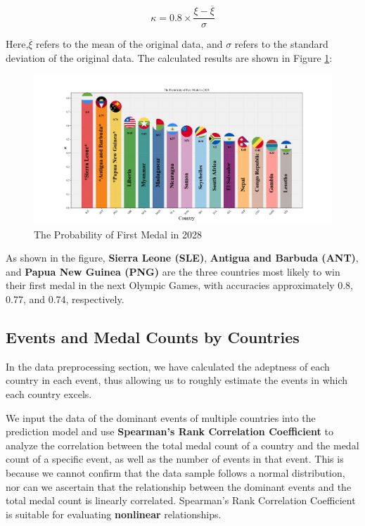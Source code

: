 \documentclass[12pt]{article}  %
\begin{document}
\begin{equation}
	\kappa = 0.8 \times \frac{\xi - \overline{\xi}}{\sigma}
\end{equation}

Here,$\overline{\xi}$ refers to the mean of the original data, and $\sigma$ refers to the standard deviation of the original data.
The calculated results are shown in Figure \ref{fig:First Medal}:
\begin{figure}[H]
	\centering
	\includegraphics[width=16cm]{img/First.png}
	\caption{The Probability of First Medal in 2028}
	\label{fig:First Medal}
\end{figure}


As shown in the figure, \textbf{Sierra Leone (SLE)}, \textbf{Antigua and Barbuda (ANT)}, and \textbf{Papua New Guinea (PNG)} are the three countries most likely to win their first medal in the next Olympic Games, with accuracies approximately 0.8, 0.77, and 0.74, respectively.


\subsection{Events and Medal Counts by Countries}
In the data preprocessing section, we have calculated the adeptness of each country in each event, thus allowing us to roughly estimate the events in which each country excels.

We input the data of the dominant events of multiple countries into the prediction model and use \textbf{Spearman's Rank Correlation Coefficient} to analyze the correlation between the total medal count of a country and the medal count of a specific event, as well as the number of events in that event. This is because we cannot confirm that the data sample follows a normal distribution, nor can we ascertain that the relationship between the dominant events and the total medal count is linearly correlated. Spearman's Rank Correlation Coefficient is suitable for evaluating \textbf{nonlinear} relationships.
\end{document}
